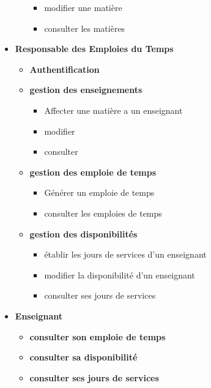 \documentclass[english,12pt,a4paper]{report}
\begin{document}
\begin{itemize}
\begin{itemize}
\begin{itemize}
			\item modifier une matière
			\item consulter les matières
		\end{itemize}
	\end{itemize}	
	\item \textbf{Responsable des Emploies du Temps}
	\begin{itemize}
		\item \textbf{Authentification}
		\item \textbf{gestion des enseignements}
		\begin{itemize}
			\item Affecter une matière a un enseignant
			\item modifier
			\item consulter
		\end{itemize}
		\item \textbf{gestion des emploie de temps}
		\begin{itemize}
			\item Générer un emploie de temps
			\item consulter les emploies de temps
		\end{itemize}
		\item \textbf{gestion des disponibilités}
		\begin{itemize}
			\item établir les jours de services d'un enseignant
			\item modifier la disponibilité d'un enseignant
			\item consulter ses jours de services
		\end{itemize}
	\end{itemize}
	\item \textbf{Enseignant}
	\begin{itemize}
		\item \textbf{consulter son emploie de temps}
		\item \textbf{consulter sa disponibilité}
		\item \textbf{consulter ses jours de services}
	\end{itemize}
\end{itemize}
\end{document}
